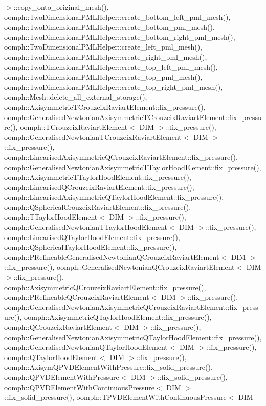 $>$\+::copy\+\_\+onto\+\_\+original\+\_\+mesh(), oomph\+::\+Two\+Dimensional\+P\+M\+L\+Helper\+::create\+\_\+bottom\+\_\+left\+\_\+pml\+\_\+mesh(), oomph\+::\+Two\+Dimensional\+P\+M\+L\+Helper\+::create\+\_\+bottom\+\_\+pml\+\_\+mesh(), oomph\+::\+Two\+Dimensional\+P\+M\+L\+Helper\+::create\+\_\+bottom\+\_\+right\+\_\+pml\+\_\+mesh(), oomph\+::\+Two\+Dimensional\+P\+M\+L\+Helper\+::create\+\_\+left\+\_\+pml\+\_\+mesh(), oomph\+::\+Two\+Dimensional\+P\+M\+L\+Helper\+::create\+\_\+right\+\_\+pml\+\_\+mesh(), oomph\+::\+Two\+Dimensional\+P\+M\+L\+Helper\+::create\+\_\+top\+\_\+left\+\_\+pml\+\_\+mesh(), oomph\+::\+Two\+Dimensional\+P\+M\+L\+Helper\+::create\+\_\+top\+\_\+pml\+\_\+mesh(), oomph\+::\+Two\+Dimensional\+P\+M\+L\+Helper\+::create\+\_\+top\+\_\+right\+\_\+pml\+\_\+mesh(), oomph\+::\+Mesh\+::delete\+\_\+all\+\_\+external\+\_\+storage(), oomph\+::\+Axisymmetric\+T\+Crouzeix\+Raviart\+Element\+::fix\+\_\+pressure(), oomph\+::\+Generalised\+Newtonian\+Axisymmetric\+T\+Crouzeix\+Raviart\+Element\+::fix\+\_\+pressure(), oomph\+::\+T\+Crouzeix\+Raviart\+Element$<$ D\+I\+M $>$\+::fix\+\_\+pressure(), oomph\+::\+Generalised\+Newtonian\+T\+Crouzeix\+Raviart\+Element$<$ D\+I\+M $>$\+::fix\+\_\+pressure(), oomph\+::\+Linearised\+Axisymmetric\+Q\+Crouzeix\+Raviart\+Element\+::fix\+\_\+pressure(), oomph\+::\+Generalised\+Newtonian\+Axisymmetric\+T\+Taylor\+Hood\+Element\+::fix\+\_\+pressure(), oomph\+::\+Axisymmetric\+T\+Taylor\+Hood\+Element\+::fix\+\_\+pressure(), oomph\+::\+Linearised\+Q\+Crouzeix\+Raviart\+Element\+::fix\+\_\+pressure(), oomph\+::\+Linearised\+Axisymmetric\+Q\+Taylor\+Hood\+Element\+::fix\+\_\+pressure(), oomph\+::\+Q\+Spherical\+Crouzeix\+Raviart\+Element\+::fix\+\_\+pressure(), oomph\+::\+T\+Taylor\+Hood\+Element$<$ D\+I\+M $>$\+::fix\+\_\+pressure(), oomph\+::\+Generalised\+Newtonian\+T\+Taylor\+Hood\+Element$<$ D\+I\+M $>$\+::fix\+\_\+pressure(), oomph\+::\+Linearised\+Q\+Taylor\+Hood\+Element\+::fix\+\_\+pressure(), oomph\+::\+Q\+Spherical\+Taylor\+Hood\+Element\+::fix\+\_\+pressure(), oomph\+::\+P\+Refineable\+Generalised\+Newtonian\+Q\+Crouzeix\+Raviart\+Element$<$ D\+I\+M $>$\+::fix\+\_\+pressure(), oomph\+::\+Generalised\+Newtonian\+Q\+Crouzeix\+Raviart\+Element$<$ D\+I\+M $>$\+::fix\+\_\+pressure(), oomph\+::\+Axisymmetric\+Q\+Crouzeix\+Raviart\+Element\+::fix\+\_\+pressure(), oomph\+::\+P\+Refineable\+Q\+Crouzeix\+Raviart\+Element$<$ D\+I\+M $>$\+::fix\+\_\+pressure(), oomph\+::\+Generalised\+Newtonian\+Axisymmetric\+Q\+Crouzeix\+Raviart\+Element\+::fix\+\_\+pressure(), oomph\+::\+Axisymmetric\+Q\+Taylor\+Hood\+Element\+::fix\+\_\+pressure(), oomph\+::\+Q\+Crouzeix\+Raviart\+Element$<$ D\+I\+M $>$\+::fix\+\_\+pressure(), oomph\+::\+Generalised\+Newtonian\+Axisymmetric\+Q\+Taylor\+Hood\+Element\+::fix\+\_\+pressure(), oomph\+::\+Generalised\+Newtonian\+Q\+Taylor\+Hood\+Element$<$ D\+I\+M $>$\+::fix\+\_\+pressure(), oomph\+::\+Q\+Taylor\+Hood\+Element$<$ D\+I\+M $>$\+::fix\+\_\+pressure(), oomph\+::\+Axisym\+Q\+P\+V\+D\+Element\+With\+Pressure\+::fix\+\_\+solid\+\_\+pressure(), oomph\+::\+Q\+P\+V\+D\+Element\+With\+Pressure$<$ D\+I\+M $>$\+::fix\+\_\+solid\+\_\+pressure(), oomph\+::\+Q\+P\+V\+D\+Element\+With\+Continuous\+Pressure$<$ D\+I\+M $>$\+::fix\+\_\+solid\+\_\+pressure(), oomph\+::\+T\+P\+V\+D\+Element\+With\+Continuous\+Pressure$<$ D\+I\+M 
